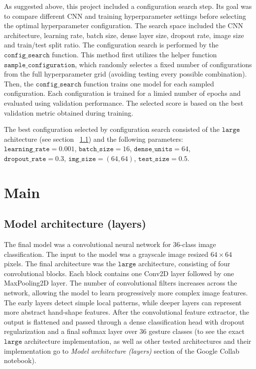 \documentclass{article}
\newcommand{\code}[1]{\texttt{#1}} %
\begin{document}
As suggested above, this project included a configuration search step. Its goal was to compare different CNN and training hyperparameter settings before selecting the optimal hyperparameter configuration. 
The search space included the CNN architecture, learning rate, batch size, dense layer size, dropout rate, image size and train/test split ratio. The configuration search is performed by the 
$\code{config\_search}$ function. This method first utilizes the helper function $\code{sample\_configuration}$, which randomly selectes a fixed number of configurations from the full hyperparameter grid 
(avoiding testing every possible combination). Then, the $\code{config\_search}$ function trains one model for each sampled configuration. Each configuration is trained for a limied number of epochs and 
evaluated using validation performance. The selected score is based on the best validation metric obtained during training.  

The best configuration selected by configuration search consisted of the $\code{large}$ achitecture (see section ~\ref{sec:5.1}) and the following parameters: 
$\code{learning\_rate} = 0.001$, $\code{batch\_size}=16$, $\code{dense\_units}=64$, $\code{dropout\_rate}=0.3$, $\code{img\_size}=(64,64)$, $\code{test\_size}=0.5$.  

\section{Main}
\label{sec:5}
\subsection{Model architecture (layers)}
\label{sec:5.1}
The final model was a convolutional neural network for 36-class image classification. The input to the model was a grayscale image resized $64 \times 64$ pixels. The final architecture was the $\code{large}$
architecture, consisting of four convolutional blocks. Each block contains one Conv2D layer followed by one MaxPooling2D layer. The number of convolutional filters increases across the network, allowing the 
model to learn progressively more complex image features. The early layers detect simple local patterns, while deeper layers can represent more abstract hand-shape features. After the convolutional feature 
extractor, the output is flattened and passed through a dense classification head with dropout regularization and a final softmax layer over 36 gesture classes (to see the exact $\code{large}$ architecture 
implementation, as well as other tested architectures and their implementation go to \textit{Model architecture (layers)} section of the Google Collab notebook).
\end{document}
